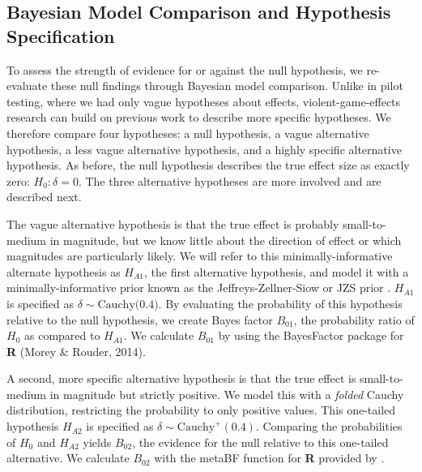 \documentclass[man]{apa6}
\begin{document}
\subsection{Bayesian Model Comparison and Hypothesis Specification}
To assess the strength of evidence for or against the null hypothesis, we re-evaluate these null findings through Bayesian model comparison. Unlike in pilot testing, where we had only vague hypotheses about effects, violent-game-effects research can build on previous work to describe more specific hypotheses. We therefore compare four hypotheses: a null hypothesis, a vague alternative hypothesis, a less vague alternative hypothesis, and a highly specific alternative hypothesis. As before, the null hypothesis describes the true effect size as exactly zero: $H_0: \delta = 0$. The three alternative hypotheses are more involved and are described next. 

The vague alternative hypothesis is that the true effect is probably small-to-medium in magnitude, but we know little about the direction of effect or which magnitudes are particularly likely. We will refer to this minimally-informative alternate hypothesis as $H_{A1}$, the first alternative hypothesis, and model it with a minimally-informative prior known as the Jeffreys-Zellner-Siow or JZS prior \citep[see ][]{Jeffreys:1961,Liang:etal:2008,Rouder:etal:2009a,Zellner:Siow:1980}. %
$H_{A1}$ is specified as $\delta \sim \mbox{Cauchy(0.4)}$. By evaluating the probability of this hypothesis relative to the null hypothesis, we create Bayes factor $B_{01}$, the probability ratio of $H_0$ as compared to $H_{A1}$. We calculate $B_{01}$ by using the BayesFactor package for \textbf{R} (Morey \& Rouder, 2014).  

A second, more specific alternative hypothesis is that the true effect is small-to-medium in magnitude but strictly positive. We model this with a {\em folded} Cauchy distribution, restricting the probability to only positive values. This one-tailed hypothesis $H_{A2}$ is specified as $\delta \sim \mbox{Cauchy}^{+}(0.4)$. Comparing the probabilities of $H_0$ and $H_{A2}$ yields $B_{02}$, the evidence for the null relative to this one-tailed alternative. We calculate $B_{02}$ with the metaBF function for \textbf{R} provided by \citet{Rouder:Morey:2011}.
\end{document}
